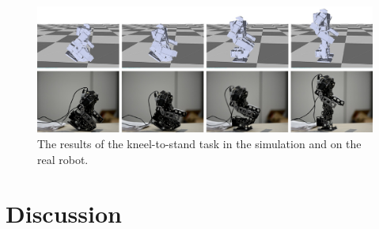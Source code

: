 \begin{figure}[!t]
  \centering
  \includegraphics[width=\textwidth]{figures/kneel2Stand}
  \caption{The results of the kneel-to-stand task in the simulation and on the real robot.}
  \label{fig:kneel2Stand}
\end{figure}

\section{Discussion}
